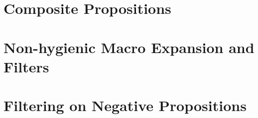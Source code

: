 \section{Composite Propositions}

\section{Non-hygienic Macro Expansion and Filters}

\section{Filtering on Negative Propositions}
\label{sec:filterneg}
